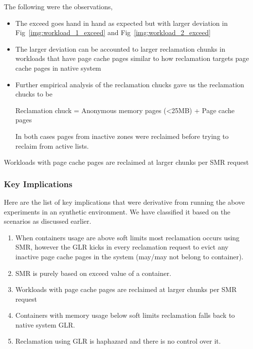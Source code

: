 	  The following were the observations,	  
	  \begin{itemize}
	    \item The exceed goes hand in hand as expected but with larger deviation in Fig~\ref{img:workload_1_exceed} and 
  Fig~\ref{img:workload_2_exceed}
	    \item The larger deviation can be accounted to larger reclamation chunks in workloads that have page cache pages similar to how 
  reclamation targets page cache pages in native system
	    \item Further empirical analysis of the reclamation chucks gave us the reclamation chucks to be 
		\begin{center}
		    Reclamation chuck = Anonymous memory pages (\textless 25MB) + Page cache pages
		\end{center}
		In both cases pages from inactive zones were reclaimed before trying to reclaim from active lists.
	  \end{itemize}

	    Workloads with page cache pages are reclaimed at larger chunks per SMR request
	  
      \subsubsection{Key Implications}
      \label{sec:mem_management}
    
	Here are the list of key implications that were derivative from running the above experiments in an synthetic environment. We have 
    classified it based on the scenarios as discussed earlier.
	
	\begin{enumerate}
	  \item When containers usage are above soft limits most reclamation occurs using SMR, however the GLR kicks in every reclamation 
    request to evict any  inactive page cache pages in the system (may/may not belong to container).      
	  \item SMR is purely based on exceed value of a container.
	  \item Workloads with page cache pages are reclaimed at larger chunks per SMR request
	  \item Containers with memory usage below soft limits reclamation falls back to native system GLR.
	  \item Reclamation using GLR is haphazard and there is no control over it. 
	\end{enumerate}
	
